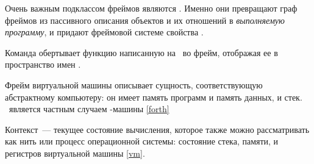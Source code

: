 \clearpage
{}\secdown


\medskip\noindent
Очень важным подклассом фреймов являются . Именно они
превращают граф фреймов из пассивного описания объектов и их отношений в
\emph{выполняемую программу}, и придают фреймовой системе свойства
.

\clearpage
{}\label{cmd}


\medskip\noindent
Команда обертывает функцию написанную на \py\ во фрейм, отображая ее в
пространство имен \metal.

\clearpage
{}\label{vm}


\medskip\noindent
Фрейм виртуальной машины описывает сущность, соответствующую абстрактному
компьютеру: он имеет память программ и память данных, и стек. \ является частным случаем \F-машины
\ref{forth}

\label{context}

 
\medskip\noindent
Контекст\ --- текущее состояние вычисления, которое также можно рассматривать
как нить или процесс операционной системы: состояние стека, памяти, и регистров
виртуальной машины \ref{vm}.

\secup
